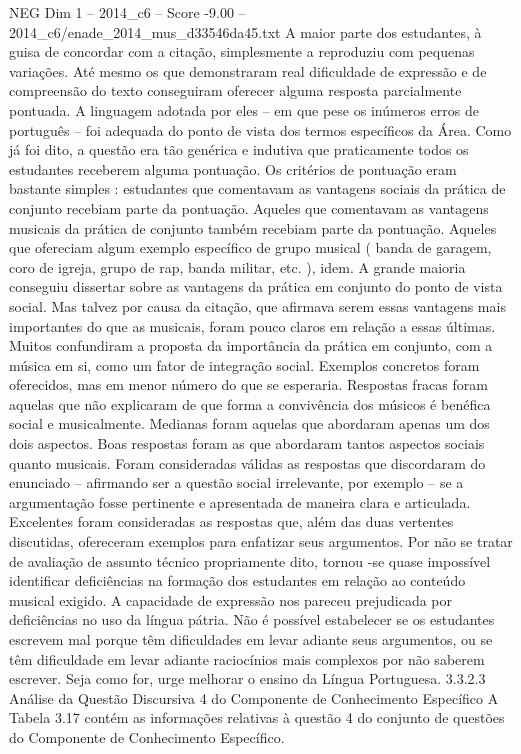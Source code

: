 \begin{textsample}{NEG Dim 1 – 2014\_c6 – Score -9.00 – 2014\_c6/enade\_2014\_mus\_d33546da45.txt}
A maior parte dos estudantes, à guisa de concordar com a citação, simplesmente a reproduziu com pequenas variações.
Até mesmo os que demonstraram real dificuldade de expressão e de compreensão do texto conseguiram oferecer alguma resposta parcialmente pontuada.
A linguagem adotada por eles – em que pese os inúmeros erros de português – foi adequada do ponto de vista dos termos específicos da Área.
Como já foi dito, a questão era tão genérica e indutiva que praticamente todos os estudantes receberem alguma pontuação.
Os critérios de pontuação eram bastante simples : estudantes que comentavam as vantagens sociais da prática de conjunto recebiam parte da pontuação.
Aqueles que comentavam as vantagens musicais da prática de conjunto também recebiam parte da pontuação.
Aqueles que ofereciam algum exemplo específico de grupo musical ( banda de garagem, coro de igreja, grupo de rap, banda militar, etc. ), idem.
A grande maioria conseguiu dissertar sobre as vantagens da prática em conjunto do ponto de vista social.
Mas talvez por causa da citação, que afirmava serem essas vantagens mais importantes do que as musicais, foram pouco claros em relação a essas últimas.
Muitos confundiram a proposta da importância da prática em conjunto, com a música em si, como um fator de integração social.
Exemplos concretos foram oferecidos, mas em menor número do que se esperaria.
Respostas fracas foram aquelas que não explicaram de que forma a convivência dos músicos é benéfica social e musicalmente.
Medianas foram aquelas que abordaram apenas um dos dois aspectos.
Boas respostas foram as que abordaram tantos aspectos sociais quanto musicais.
Foram consideradas válidas as respostas que discordaram do enunciado – afirmando ser a questão social irrelevante, por exemplo – se a argumentação fosse pertinente e apresentada de maneira clara e articulada.
Excelentes foram consideradas as respostas que, além das duas vertentes discutidas, ofereceram exemplos para enfatizar seus argumentos.
Por não se tratar de avaliação de assunto técnico propriamente dito, tornou -se quase impossível identificar deficiências na formação dos estudantes em relação ao conteúdo musical exigido.
A capacidade de expressão nos pareceu prejudicada por deficiências no uso da língua pátria.
Não é possível estabelecer se os estudantes escrevem mal porque têm dificuldades em levar adiante seus argumentos, ou se têm dificuldade em levar adiante raciocínios mais complexos por não saberem escrever.
Seja como for, urge melhorar o ensino da Língua Portuguesa. 3.3.2.3 Análise da Questão Discursiva 4 do Componente de Conhecimento Específico A Tabela 3.17 contém as informações relativas à questão 4 do conjunto de questões do Componente de Conhecimento Específico.

\end{textsample}

